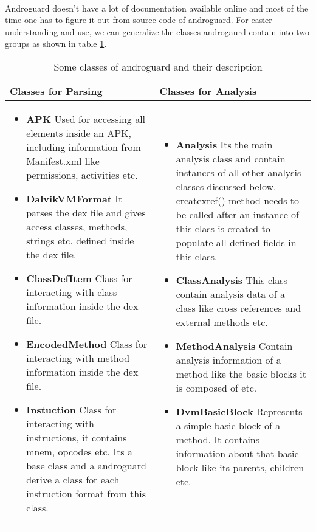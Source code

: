 \documentclass[../main.tex]{subfile}
\begin{document}
		\paragraph{} Androguard doesn't have a lot of documentation available online and most of the time one has to figure it out from source code of androguard. For easier understanding and use, we can generalize the classes androgaurd contain into two groups as shown in table \ref{table:androguard_classes}.
				
		\begin{table} 
			\begin{center}
				\begin{tabular}{|p{5cm}|p{5cm}|}
					\hline \textbf{Classes for Parsing} & \textbf{Classes for Analysis}\\ \hline
					\begin{itemize}
						\item \textbf{APK} Used for accessing all elements inside an APK, including information from Manifest.xml like permissions, activities etc.
						\item \textbf{DalvikVMFormat}	It parses the dex file and gives access classes, methods, strings etc. defined inside the dex file.
						\item \textbf{ClassDefItem} Class for interacting with class information inside the dex file.
						\item \textbf{EncodedMethod} Class for interacting with method information inside the dex file. 
						\item \textbf{Instuction} Class for interacting with instructions, it contains mnem, opcodes etc. Its a base class and a androguard derive a class for each instruction format from this class.
					\end{itemize}
					
					&
					
					\begin{itemize}
						\item \textbf{Analysis} Its the main analysis class and contain instances of all other analysis classes discussed below. create\textunderscore xref() method needs to be called after an instance of this class is created to populate all defined fields in this class.
						\item \textbf{ClassAnalysis} This class contain analysis data of a class like cross references and external methods etc.
						\item \textbf{MethodAnalysis} Contain analysis information of a method like the basic blocks it is composed of etc.
						\item \textbf{DvmBasicBlock} Represents a simple basic block of a method. It contains information about that basic block like its parents, children etc.
						\end{itemize}\\ \hline
					
				\end{tabular}
			\end{center}
			\caption{Some classes of androguard and their description}
			\label{table:androguard_classes}
		\end{table}
		
\end{document}
